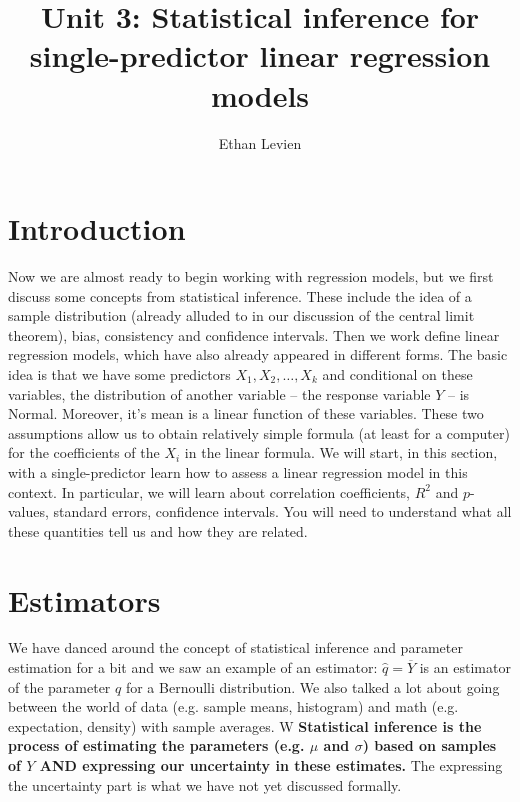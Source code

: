 
\setcounter{unit}{3}
\setcounter{section}{0}



\title{Unit 3: Statistical inference for single-predictor linear regression models}
\author{Ethan Levien}
\maketitle
\tableofcontents



\newif\ifhideproofs

\ifhideproofs
\usepackage{environ}
\NewEnviron{hide}{}
\let\proof\hide
\let\endproof\endhide
\fi






\section{Introduction}


Now we are almost ready to begin working with regression models, but we first discuss some concepts from statistical inference. These include the idea of a sample distribution (already alluded to in our discussion of the central limit theorem), bias, consistency and confidence intervals. Then we work define linear regression models, which have also already appeared in different forms.    The basic idea is that we have some predictors $X_1,X_2,\dots,X_k$ and conditional on these variables, the distribution of another variable -- the response variable $Y$ -- is Normal. Moreover, it's mean is a linear function of these variables. These two assumptions allow us to obtain relatively simple formula (at least for a computer) for the coefficients of the $X_i$ in the linear formula. We will start, in this section, with a single-predictor learn how to assess a linear regression model in this context. In particular, we will learn about correlation coefficients, $R^2$ and $p$-values, standard errors, confidence intervals. You will need to understand what all these quantities tell us and how they are related. 





\section{Estimators}
We have danced around the concept of statistical inference and parameter estimation for a bit and we saw an example of an estimator: $\hat{q} = \overline{Y}$ is an estimator of the parameter $q$ for a Bernoulli distribution.  We also talked a lot about going between the world of data (e.g. sample means, histogram) and math (e.g. expectation, density) with sample averages. W
{\bf Statistical inference is the process of estimating the parameters (e.g. $\mu$ and $\sigma$) based on samples of $Y$ AND expressing our uncertainty in these estimates.} The expressing the uncertainty part is what we have not yet discussed formally. 


